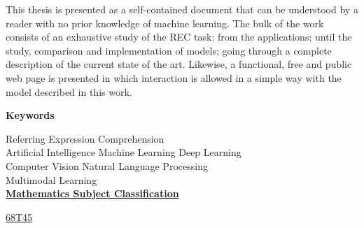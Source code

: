 This thesis is presented as a self-contained document that can be understood by
a reader with no prior knowledge of machine learning. The bulk of the work
consists of an exhaustive study of the REC task: from the applications; until
the study, comparison and implementation of models; going through a complete
description of the current state of the art. Likewise, a functional, free and
public web page is presented in which interaction is allowed in a simple way
with the model described in this work.

\begin{center}


  \bigskip\smallskip
  \textbf{Keywords}

  Referring Expression Comprehension\\
  Artificial Intelligence \textbullet{} Machine Learning \textbullet{} Deep
  Learning\\
  Computer Vision \textbullet{} Natural Language Processing\\
  Multimodal Learning\\

  \bigskip
  \href{https://mathscinet.ams.org/msc/msc2010.html}{\textbf{Mathematics
      Subject Classification}}

  \href{https://mathscinet.ams.org/msc/msc2010.html?t=68Txx}{68T45}
\end{center}

\vfill\null{}


\clearpage
\thispagestyle{plain}
\null\vfill


